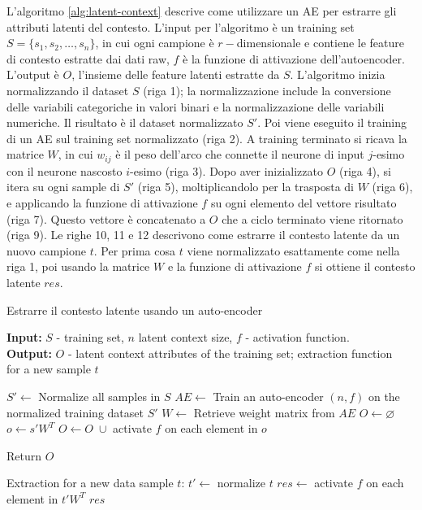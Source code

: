 L'algoritmo \autoref{alg:latent-context} descrive come utilizzare un AE per estrarre gli attributi latenti del contesto. L'input per l'algoritmo è un training set $S = \{s_1, s_2, \dots, s_n\}$, in cui ogni campione è $r-$dimensionale e contiene le feature di contesto estratte dai dati raw, $f$ è la funzione di attivazione dell'autoencoder. L'output è $O$, l'insieme delle feature latenti estratte da $S$. L'algoritmo inizia normalizzando il dataset $S$ (riga 1); la normalizzazione include la conversione delle variabili categoriche in valori binari e la normalizzazione delle variabili numeriche. Il risultato è il dataset normalizzato $S'$. Poi viene eseguito il training di un AE sul training set normalizzato (riga 2). A training terminato si ricava la matrice $W$, in cui $w_{ij}$ è il peso dell'arco che connette il neurone di input $j$-esimo con il neurone nascosto $i$-esimo (riga 3). Dopo aver inizializzato $O$ (riga 4), si itera su ogni sample di $S'$ (riga 5), moltiplicandolo per la trasposta di $W$ (riga 6), e applicando la funzione di attivazione $f$ su ogni elemento del vettore risultato (riga 7). Questo vettore è concatenato a $O$ che a ciclo terminato viene ritornato (riga 9). Le righe 10, 11 e 12 descrivono come estrarre il contesto latente da un nuovo campione $t$. Per prima cosa $t$ viene normalizzato esattamente come nella riga 1, poi usando la matrice $W$ e la funzione di attivazione $f$ si ottiene il contesto latente $res$.

\begin{algorithm}
\caption{Estrarre il contesto latente usando un auto-encoder \cite{latent-context}}
\label{alg:latent-context}
 \hspace*{\algorithmicindent} \textbf{Input:} $S$ - training set, $n$ latent context size, $f$ - activation function.\\
 \hspace*{\algorithmicindent} \textbf{Output:} $O$ - latent context attributes of the training set; extraction function\\ 
 \hspace*{\algorithmicindent} for a new sample $t$
\begin{algorithmic}[1]
\STATE $S' \leftarrow$ Normalize all samples in $S$
\STATE $AE \leftarrow$ Train an auto-encoder $(n,f)$ on the normalized training dataset $S'$
\STATE $W \leftarrow$ Retrieve weight matrix from $AE$
\STATE $O \leftarrow \varnothing$
	\STATE $o \leftarrow s'W^T$
	\STATE $O \leftarrow O \; \cup$ activate $f$ on each element in $o$ 
\ENDFOR

\STATE Return $O$

Extraction for a new data sample $t$:
\STATE $t' \leftarrow$ normalize $t$
\STATE $res \leftarrow$ activate $f$ on each element in $t'W^T$ 
\RETURN $res$

\end{algorithmic}
\end{algorithm}


